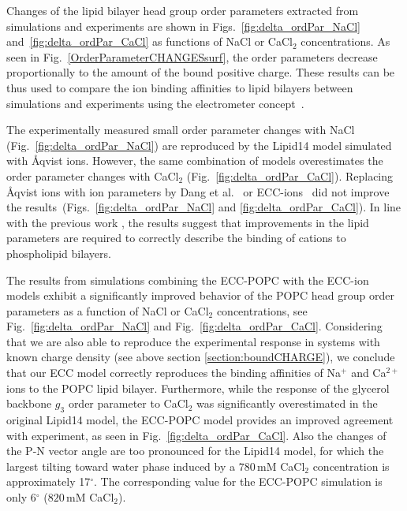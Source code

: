  
Changes of the lipid bilayer head group order parameters extracted from simulations and 
experiments \citep{akutsu81, altenbach84} are shown in Figs.~\ref{fig:delta_ordPar_NaCl} 
and~\ref{fig:delta_ordPar_CaCl} as functions of NaCl or CaCl$_2$ concentrations. 
As seen in Fig.~\ref{OrderParameterCHANGESsurf}, the order parameters decrease 
proportionally to the amount of the bound positive charge. 
These results can be thus used to compare the ion binding affinities to lipid bilayers between 
simulations and experiments using the electrometer concept~\citep{seelig87, catte16}. 
 
The experimentally measured small order parameter 
changes with NaCl (Fig.~\ref{fig:delta_ordPar_NaCl})  
are reproduced by the Lipid14 model simulated with Åqvist ions. 
However, the same combination of models overestimates the order parameter changes with CaCl$_2$ (Fig.~\ref{fig:delta_ordPar_CaCl}). 
Replacing Åqvist ions with ion parameters by Dang et al.~\citep{smith94, chang1999, dang2006} 
or ECC-ions~\citep{martinek17, kohagen16, Pluharova2014} did not improve 
the results~(Figs.~\ref{fig:delta_ordPar_NaCl} and \ref{fig:delta_ordPar_CaCl}). 
In line with the previous work \citep{catte16}, the results suggest that improvements 
in the lipid parameters are required to correctly describe the binding of cations to phospholipid bilayers. 
 
The results from simulations combining the ECC-POPC with the ECC-ion models \citep{martinek17, kohagen16, Pluharova2014} exhibit a significantly improved behavior of the POPC head group order parameters as a function of NaCl or CaCl$_2$ concentrations, see Fig.~\ref{fig:delta_ordPar_NaCl} and Fig.~\ref{fig:delta_ordPar_CaCl}. Considering that we are also able to reproduce the experimental response in systems with known charge density (see above section \ref{section:boundCHARGE}), we conclude that our ECC model correctly reproduces the binding affinities of Na$^{+}$ and Ca$^{2+}$ ions to the POPC lipid bilayer. Furthermore, while the response of the glycerol backbone $g_3$ order parameter to CaCl$_2$ was significantly overestimated in the original Lipid14 model, the ECC-POPC model provides an improved agreement with experiment, as seen in Fig.~\ref{fig:delta_ordPar_CaCl}. 
Also the changes of the P-N vector angle are too pronounced for the Lipid14 model, 
for which the largest tilting toward water phase induced by a $780\,\mathrm{mM}$ 
CaCl$_2$ concentration is approximately 17$^{\circ}$. The corresponding value 
for the ECC-POPC simulation is only 6$^{\circ}$ ($820\,\mathrm{mM}$ CaCl$_2$).  

